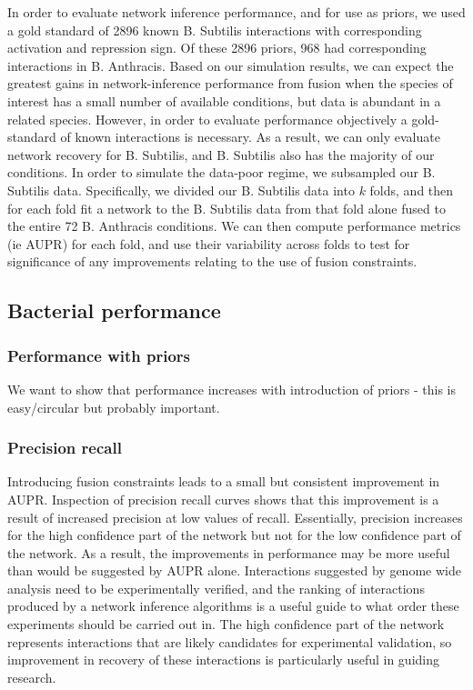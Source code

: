 \documentclass[11pt]{article}
\begin{document}
In order to evaluate network inference performance, and for use as priors, we used a gold standard of 2896 known B. Subtilis interactions with corresponding activation and repression sign. Of these 2896 priors, 968 had corresponding interactions in B. Anthracis. Based on our simulation results, we can expect the greatest gains in network-inference performance from fusion when the species of interest has a small number of available conditions, but data is abundant in a related species. However, in order to evaluate performance objectively a gold-standard of known interactions is necessary. As a result, we can only evaluate network recovery for B. Subtilis, and B. Subtilis also has the majority of our conditions. In order to simulate the data-poor regime, we subsampled our B. Subtilis data. Specifically, we divided our B. Subtilis data into $k$ folds, and then for each fold fit a network to the B. Subtilis data from that fold alone fused to the entire 72 B. Anthracis conditions. We can then compute performance metrics (ie AUPR) for each fold, and use their variability across folds to test for significance of any improvements relating to the use of fusion constraints. 

\subsection{Bacterial performance}
\subsubsection{Performance with priors}
We want to show that performance increases with introduction of priors - this is easy/circular but probably important.

\subsubsection{Precision recall}
Introducing fusion constraints leads to a small but consistent improvement in AUPR. Inspection of precision recall curves shows that this improvement is a result of increased precision at low values of recall. Essentially, precision increases for the high confidence part of the network but not for the low confidence part of the network. As a result, the improvements in performance may be more useful than would be suggested by AUPR alone. Interactions suggested by genome wide analysis need to be experimentally verified, and the ranking of interactions produced by a network inference algorithms is a useful guide to what order these experiments should be carried out in. The high confidence part of the network represents interactions that are likely candidates for experimental validation, so improvement in recovery of these interactions is particularly useful in guiding research. 
\end{document}
